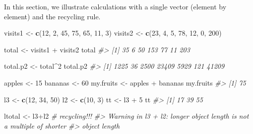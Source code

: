 \documentclass[]{book}
\newenvironment{Shaded}{}{}
\newcommand{\CommentTok}[1]{\textcolor[rgb]{0.38,0.63,0.69}{\textit{#1}}}
\newcommand{\DecValTok}[1]{\textcolor[rgb]{0.25,0.63,0.44}{#1}}
\newcommand{\KeywordTok}[1]{\textcolor[rgb]{0.00,0.44,0.13}{\textbf{#1}}}
\newcommand{\NormalTok}[1]{#1}
\newcommand{\OperatorTok}[1]{\textcolor[rgb]{0.40,0.40,0.40}{#1}}
\newcommand{\StringTok}[1]{\textcolor[rgb]{0.25,0.44,0.63}{#1}}
\theoremstyle{definition}
\theoremstyle{definition}
\theoremstyle{definition}
\theoremstyle{remark}
\begin{document}
In this section, we illustrate calculations with a single vector
(element by element) and the recycling rule.

\begin{Shaded}
\begin{Highlighting}[]
\NormalTok{visits1 <-}\StringTok{  }\KeywordTok{c}\NormalTok{(}\DecValTok{12}\NormalTok{, }\DecValTok{2}\NormalTok{, }\DecValTok{45}\NormalTok{, }\DecValTok{75}\NormalTok{, }\DecValTok{65}\NormalTok{, }\DecValTok{11}\NormalTok{, }\DecValTok{3}\NormalTok{)}
\NormalTok{visits2 <-}\StringTok{ }\KeywordTok{c}\NormalTok{(}\DecValTok{23}\NormalTok{, }\DecValTok{4}\NormalTok{, }\DecValTok{5}\NormalTok{, }\DecValTok{78}\NormalTok{, }\DecValTok{12}\NormalTok{, }\DecValTok{0}\NormalTok{, }\DecValTok{200}\NormalTok{)}

\NormalTok{total <-}\StringTok{ }\NormalTok{visits1 }\OperatorTok{+}\StringTok{ }\NormalTok{visits2}
\NormalTok{total}
\CommentTok{#> [1]  35   6  50 153  77  11 203}

\NormalTok{total.p2 <-}\StringTok{ }\NormalTok{total}\OperatorTok{^}\DecValTok{2}
\NormalTok{total.p2}
\CommentTok{#> [1]  1225    36  2500 23409  5929   121 41209}

\NormalTok{apples <-}\StringTok{ }\DecValTok{15}
\NormalTok{bananas <-}\StringTok{ }\DecValTok{60}
\NormalTok{my.fruits <-}\StringTok{ }\NormalTok{apples }\OperatorTok{+}\StringTok{ }\NormalTok{bananas}
\NormalTok{my.fruits}
\CommentTok{#> [1] 75}

\NormalTok{l3 <-}\StringTok{ }\KeywordTok{c}\NormalTok{(}\DecValTok{12}\NormalTok{, }\DecValTok{34}\NormalTok{, }\DecValTok{50}\NormalTok{)}
\NormalTok{l2 <-}\StringTok{ }\KeywordTok{c}\NormalTok{(}\DecValTok{10}\NormalTok{, }\DecValTok{3}\NormalTok{)}
\NormalTok{tt <-}\StringTok{ }\NormalTok{l3 }\OperatorTok{+}\StringTok{ }\DecValTok{5} 
\NormalTok{tt}
\CommentTok{#> [1] 17 39 55}

\NormalTok{ltotal <-}\StringTok{ }\NormalTok{l3}\OperatorTok{+}\NormalTok{l2 }\CommentTok{# recycling!!!}
\CommentTok{#> Warning in l3 + l2: longer object length is not a multiple of shorter}
\CommentTok{#> object length}
\end{Highlighting}
\end{Shaded}
\end{document}
